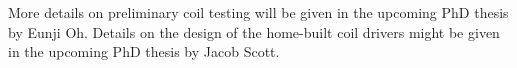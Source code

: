 More details on preliminary coil testing will be given in the upcoming PhD thesis by Eunji Oh. Details on the design of the home-built coil drivers might be given in the upcoming PhD thesis by Jacob Scott. 





